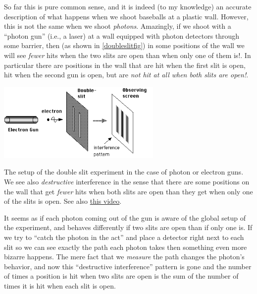 So far this is pure common sense, and it is indeed (to my knowledge) an
accurate description of what happens when we shoot baseballs at a
plastic wall. However, this is not the same when we shoot
\emph{photons}. Amazingly, if we shoot with a ``photon gun'' (i.e., a
laser) at a wall equipped with photon detectors through some barrier,
then (as shown in \cref{doubleslitfig}) in some positions of the wall we
will see \emph{fewer} hits when the two slits are open than when only
one of them is!. In particular there are positions in the wall that are
hit when the first slit is open, hit when the second gun is open, but
are \emph{not hit at all when both slits are open!}.


\begin{marginfigure}
\centering
\includegraphics[width=\linewidth, height=1.5in, keepaspectratio]{../figure/double-slit-setup.PNG}
\caption{The setup of the double slit experiment in the case of photon
or electron guns. We see also \emph{destructive} interference in the
sense that there are some positions on the wall that get \emph{fewer}
hits when both slits are open than they get when only one of the slits
is open. See also
\href{https://www.youtube.com/watch?v=DfPeprQ7oGc}{this video}.}
\label{doubleslitfig}
\end{marginfigure}

It seems as if each photon coming out of the gun is aware of the global
setup of the experiment, and behaves differently if two slits are open
than if only one is. If we try to ``catch the photon in the act'' and
place a detector right next to each slit so we can see exactly the path
each photon takes then something even more bizarre happens. The mere
fact that we \emph{measure} the path changes the photon's behavior, and
now this ``destructive interference'' pattern is gone and the number of
times a position is hit when two slits are open is the sum of the number
of times it is hit when each slit is open.


